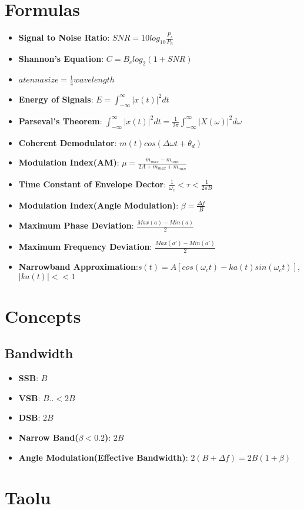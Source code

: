 \documentclass{article}
\begin{document}
\Large
     \section{Formulas}
     \begin{itemize}
        \item \textbf{Signal to Noise Ratio}: $SNR = 10log_{10}\frac{P_s}{P_n}$
        \item \textbf{Shannon's Equation}: $C = B_clog_2(1+SNR)$
        \item $atenna size = \frac{1}{4}wavelength$
        \item \textbf{Energy of Signals}: $E = \int_{-\infty} ^{\infty} |x(t)|^2dt$
        \item \textbf{Parseval's Theorem}:  $\int_{-\infty} ^{\infty} |x(t)|^2dt = \frac{1}{2\pi}\int_{-\infty}^{\infty}|X(\omega)|^2d\omega$
        \item \textbf{Coherent Demodulator}: $m(t)cos(\Delta \omega t + \theta_d)$
        \item \textbf{Modulation Index(AM)}: $\mu = \frac{m_{max} - m_{min}}{2A + m_{max} + m_{min}}$
        \item \textbf{Time Constant of Envelope Dector}: $\frac{1}{\omega_c}<\tau<\frac{1}{2\pi B}$
        
        \item \textbf{Modulation Index(Angle Modulation)}: $\beta = \frac{\Delta f}{B}$
        \item \textbf{Maximum Phase Deviation}: $\frac{Max(a) - Min(a)}{2}$
        \item \textbf{Maximum Frequency Deviation}: $\frac{Max(a')- Min(a')}{2}$
        \item \textbf{Narrowband Approximation}:$s(t) = A[cos(\omega_ct) - ka(t)sin(\omega_ct)]$, $|ka(t)|<<1$
        
     \end{itemize}
     
     
     \section{Concepts}
     \subsection{Bandwidth}
        \begin{itemize}
          \item \textbf{SSB}: $B$
          \item \textbf{VSB}: $B..<2B$
          \item \textbf{DSB}: $2B$
          \item \textbf{Narrow Band($\beta < 0.2$)}: $2B$
          \item\textbf{Angle Modulation(Effective Bandwidth)}: $2(B + \Delta f) = 2B(1+\beta)$
        \end{itemize}
     \section{Taolu}
\end{document}
